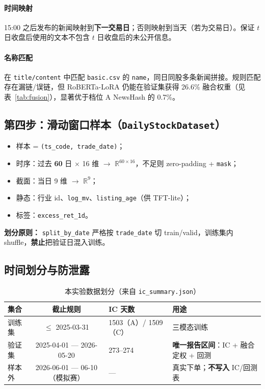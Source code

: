 \documentclass[UTF8,a4paper,12pt]{ctexart}
\begin{document}
\paragraph{时间映射}

15:00 之后发布的新闻映射到\textbf{下一交易日}；否则映射到当天（若为交易日）。保证 $t$ 日收盘后使用的文本不包含 $t$ 日收盘后的未公开信息。

\paragraph{名称匹配}

在 \texttt{title/content} 中匹配 \texttt{basic.csv} 的 \texttt{name}，同日同股多条新闻拼接。规则匹配存在漏链/误链，但 RoBERTa-LoRA 仍能在验证集获得 26.6\% 融合权重（见表~\ref{tab:fusion}），显著优于档位 A NewsHash 的 0.7\%。

\subsection{第四步：滑动窗口样本（\texttt{DailyStockDataset}）}

\begin{itemize}[leftmargin=2em]
  \item 样本 = \texttt{(ts\_code, trade\_date)}；
  \item 时序：过去 \textbf{60} 日 $\times$ 16 维 $\to$ $\mathbb{R}^{60\times 16}$，不足则 zero-padding + \texttt{mask}；
  \item 截面：当日 9 维 $\to$ $\mathbb{R}^{9}$；
  \item 静态：行业 id、\texttt{log\_mv}、\texttt{listing\_age}（供 TFT-lite）；
  \item 标签：\texttt{excess\_ret\_1d}。
\end{itemize}
\textbf{划分原则：} \texttt{split\_by\_date} 严格按 \texttt{trade\_date} 切 train/valid，训练集内 shuffle，\textbf{禁止}把验证日混入训练。

\subsection{时间划分与防泄露}

\begin{table}[H]
\centering
\caption{本实验数据划分（来自 \texttt{ic\_summary.json}）}
\label{tab:split-c}
\begin{tabular}{lcll}
\toprule
\textbf{集合} & \textbf{截止规则} & \textbf{IC 天数} & \textbf{用途} \\
\midrule
训练集 & $\le$ 2025-03-31 & 1503（A）/ 1509（C） & 三模态训练 \\
验证集 & 2025-04-01 --- 2026-05-20 & 273--274 & \textbf{唯一报告区间}：IC + 融合定权 + 回测 \\
样本外 & 2026-06-01 --- 06-10（模拟赛） & --- & 真实下单；\textbf{不写入} IC/回测表 \\
\bottomrule
\end{tabular}
\end{table}
\end{document}
